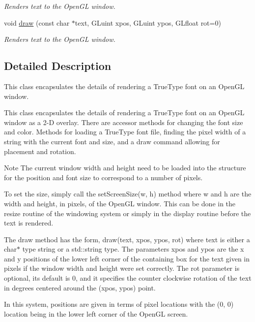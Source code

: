 \begin{DoxyCompactItemize}
\begin{DoxyCompactList}\small\item\em Renders text to the Open\+GL window. \end{DoxyCompactList}\item 
void \hyperlink{class_text_renderer_t_t_f_a131804eb5f8fc3c6f7e102ed2b003145}{draw} (const char $\ast$text, G\+Luint xpos, G\+Luint ypos, G\+Lfloat rot=0)
\begin{DoxyCompactList}\small\item\em Renders text to the Open\+GL window. \end{DoxyCompactList}\end{DoxyCompactItemize}


\subsection{Detailed Description}
This class encapsulates the details of rendering a True\+Type font on an Open\+GL window. 

This class encapsulates the details of rendering a True\+Type font on an Open\+GL window as a 2-\/D overlay. There are accessor methods for changing the font size and color. Methods for loading a True\+Type font file, finding the pixel width of a string with the current font and size, and a draw command allowing for placement and rotation.

\begin{DoxyNote}{Note}
The current window width and height need to be loaded into the structure for the position and font size to correspond to a number of pixels.

To set the size, simply call the set\+Screen\+Size(w, h) method where w and h are the width and height, in pixels, of the Open\+GL window. This can be done in the resize routine of the windowing system or simply in the display routine before the text is rendered.

The draw method has the form, draw(text, xpos, ypos, rot) where text is either a char$\ast$ type string or a std\+::string type. The parameters xpos and ypos are the x and y positions of the lower left corner of the containing box for the text given in pixels if the window width and height were set correctly. The rot parameter is optional, its default is 0, and it specifies the counter clockwise rotation of the text in degrees centered around the (xpos, ypos) point.

In this system, positions are given in terms of pixel locations with the (0, 0) location being in the lower left corner of the Open\+GL screen. 
\end{DoxyNote}


